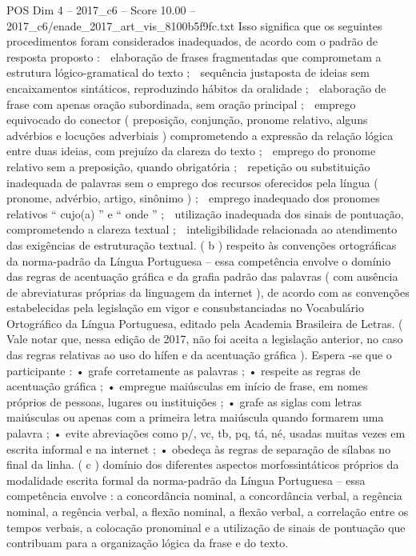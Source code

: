 \begin{textsample}{POS Dim 4 – 2017\_c6 – Score 10.00 – 2017\_c6/enade\_2017\_art\_vis\_8100b5f9fc.txt}
Isso significa que os seguintes procedimentos foram considerados inadequados, de acordo com o padrão de resposta proposto :  elaboração de frases fragmentadas que comprometam a estrutura lógico-gramatical do texto ;  sequência justaposta de ideias sem encaixamentos sintáticos, reproduzindo hábitos da oralidade ;  elaboração de frase com apenas oração subordinada, sem oração principal ;  emprego equivocado do conector ( preposição, conjunção, pronome relativo, alguns advérbios e locuções adverbiais ) comprometendo a expressão da relação lógica entre duas ideias, com prejuízo da clareza do texto ;  emprego do pronome relativo sem a preposição, quando obrigatória ;  repetição ou substituição inadequada de palavras sem o emprego dos recursos oferecidos pela língua ( pronome, advérbio, artigo, sinônimo ) ;  emprego inadequado dos pronomes relativos “ cujo(a) ” e “ onde ” ;  utilização inadequada dos sinais de pontuação, comprometendo a clareza textual ;  inteligibilidade relacionada ao atendimento das exigências de estruturação textual. ( b ) respeito às convenções ortográficas da norma-padrão da Língua Portuguesa – essa competência envolve o domínio das regras de acentuação gráfica e da grafia padrão das palavras ( com ausência de abreviaturas próprias da linguagem da internet ), de acordo com as convenções estabelecidas pela legislação em vigor e consubstanciadas no Vocabulário Ortográfico da Língua Portuguesa, editado pela Academia Brasileira de Letras. ( Vale notar que, nessa edição de 2017, não foi aceita a legislação anterior, no caso das regras relativas ao uso do hífen e da acentuação gráfica ).
Espera -se que o participante : • grafe corretamente as palavras ; • respeite as regras de acentuação gráfica ; • empregue maiúsculas em início de frase, em nomes próprios de pessoas, lugares ou instituições ; • grafe as siglas com letras maiúsculas ou apenas com a primeira letra maiúscula quando formarem uma palavra ; • evite abreviações como p/, vc, tb, pq, tá, né, usadas muitas vezes em escrita informal e na internet ; • obedeça às regras de separação de sílabas no final da linha. ( c ) domínio dos diferentes aspectos morfossintáticos próprios da modalidade escrita formal da norma-padrão da Língua Portuguesa – essa competência envolve : a concordância nominal, a concordância verbal, a regência nominal, a regência verbal, a flexão nominal, a flexão verbal, a correlação entre os tempos verbais, a colocação pronominal e a utilização de sinais de pontuação que contribuam para a organização lógica da frase e do texto.

\end{textsample}
